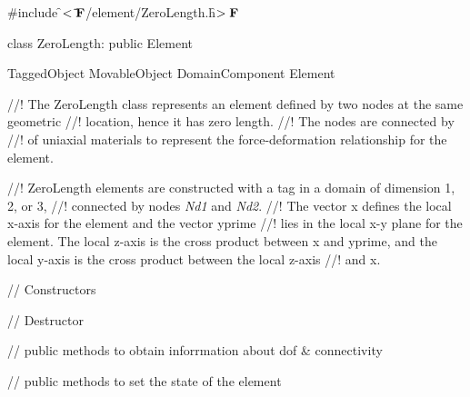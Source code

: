 
\indent \#include \f$<\tilde{ }{\bf F}$/element/ZeroLength.h\f$>{\bf F}$

\indent class ZeroLength: public Element

\indent TaggedObject
\indent MovableObject
\indent\indent DomainComponent
\indent\indent\indent Element
\indent\indent\indent{}

\indent 
//! The ZeroLength class represents an element defined by two nodes at the same geometric
//! location, hence it has zero length.
//! The nodes are connected by 
//! of uniaxial materials to represent the force-deformation relationship for the element. 

//! ZeroLength elements are constructed with a \p tag in a domain of \p dimension 1, 2, or 3,
//! connected by nodes {\em Nd1} and {\em Nd2}. 
//! The vector \p x defines the local x-axis for the element and the vector \p yprime
//! lies in the local x-y plane for the element.  The local z-axis is the cross product between 
\p x and \p yprime, and the local y-axis is the cross product between the local z-axis
//! and \p x.


\indent // Constructors


\indent // Destructor

\indent    // public methods to obtain inforrmation about dof \& connectivity

\indent    // public methods to set the state of the element

